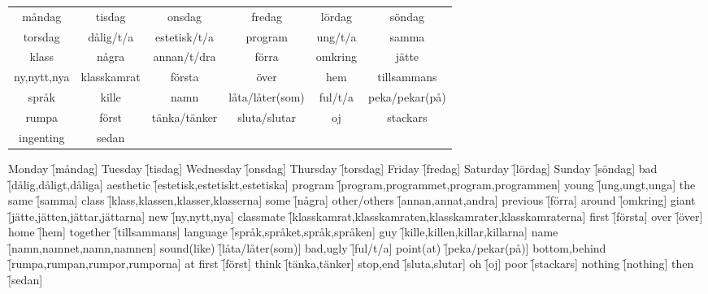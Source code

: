 \begin{center}
    \begin{tabular}{|c c c c c c|}
        \hline
        måndag & tisdag & onsdag & fredag & lördag & söndag \\
        torsdag & dålig/t/a & estetisk/t/a & program & ung/t/a & samma \\
        klass & några & annan/t/dra & förra & omkring & jätte \\
        ny,nytt,nya & klasskamrat & första & över & hem & tillsammans \\
        språk & kille & namn & låta/låter(som) & ful/t/a & peka/pekar(på) \\
        rumpa & först & tänka/tänker & sluta/slutar & oj & stackars \\
        ingenting & sedan &  &  &  &  \\
        \hline
    \end{tabular}
\end{center}

\begin{questions}
    \begin{multicols}{2}
        \raggedcolumns
        \question Monday \f[måndag]
        \question Tuesday \f[tisdag]
        \question Wednesday \f[onsdag]
        \question Thursday \f[torsdag]
        \question Friday \f[fredag]
        \question Saturday \f[lördag]
        \question Sunday \f[söndag]
        \question bad \f[dålig,dåligt,dåliga]
        \question aesthetic \f[estetisk,estetiskt,estetiska]
        \question program \f[program,programmet,program,programmen]
        \question young \f[ung,ungt,unga]
        \question the same \f[samma]
        \question class \f[klass,klassen,klasser,klasserna]
        \question some \f[några]
        \question other/others \f[annan,annat,andra]
        \question previous \f[förra]
        \question around \f[omkring]
        \question giant \f[jätte,jätten,jättar,jättarna]
        \question new \f[ny,nytt,nya]
        \question classmate \f[klasskamrat,klasskamraten,klasskamrater,klasskamraterna]
        \question first \f[första]
        \question over \f[över]
        \question home \f[hem]
        \question together \f[tillsammans]
        \question language \f[språk,språket,språk,språken]
        \question guy \f[kille,killen,killar,killarna]
        \question name \f[namn,namnet,namn,namnen]
        \question sound(like) \f[låta/låter(som)]
        \question bad,ugly \f[ful/t/a]
        \question point(at) \f[peka/pekar(på)]
        \question bottom,behind \f[rumpa,rumpan,rumpor,rumporna]
        \question at first \f[först]
        \question think \f[tänka,tänker]
        \question stop,end \f[sluta,slutar]
        \question oh \f[oj]
        \question poor \f[stackars]
        \question nothing \f[nothing]
        \question then \f[sedan]
    \end{multicols}
\end{questions}